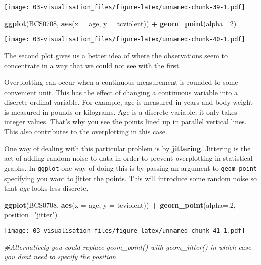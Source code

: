 \documentclass[
]{book}
\newenvironment{Shaded}{\begin{snugshade}}{\end{snugshade}}
\newcommand{\AttributeTok}[1]{\textcolor[rgb]{0.13,0.29,0.53}{#1}}
\newcommand{\CommentTok}[1]{\textcolor[rgb]{0.56,0.35,0.01}{\textit{#1}}}
\newcommand{\DecValTok}[1]{\textcolor[rgb]{0.00,0.00,0.81}{#1}}
\newcommand{\FunctionTok}[1]{\textcolor[rgb]{0.13,0.29,0.53}{\textbf{#1}}}
\newcommand{\NormalTok}[1]{#1}
\newcommand{\SpecialCharTok}[1]{\textcolor[rgb]{0.81,0.36,0.00}{\textbf{#1}}}
\newcommand{\StringTok}[1]{\textcolor[rgb]{0.31,0.60,0.02}{#1}}
\begin{document}
\texttt{[image: 03-visualisation\_files/figure-latex/unnamed-chunk-39-1.pdf]}

\begin{Shaded}
\begin{Highlighting}[]
\FunctionTok{ggplot}\NormalTok{(BCS0708, }\FunctionTok{aes}\NormalTok{(}\AttributeTok{x =}\NormalTok{ age, }\AttributeTok{y =}\NormalTok{ tcviolent)) }\SpecialCharTok{+}
  \FunctionTok{geom\_point}\NormalTok{(}\AttributeTok{alpha=}\NormalTok{.}\DecValTok{2}\NormalTok{)}
\end{Highlighting}
\end{Shaded}

\texttt{[image: 03-visualisation\_files/figure-latex/unnamed-chunk-40-1.pdf]}

The second plot gives us a better idea of where the observations seem to concentrate in a way that we could not see with the first.

Overplotting can occur when a continuous measurement is rounded to some convenient unit. This has the effect of changing a continuous variable into a discrete ordinal variable. For example, age is measured in years and body weight is measured in pounds or kilograms. Age is a discrete variable, it only takes integer values. That's why you see the points lined up in parallel vertical lines. This also contributes to the overplotting in this case.

One way of dealing with this particular problem is by \textbf{jittering}. Jittering is the act of adding random noise to data in order to prevent overplotting in statistical graphs. In \texttt{ggplot} one way of doing this is by passing an argument to \texttt{geom\_point} specifying you want to jitter the points. This will introduce some random noise so that \emph{age} looks less discrete.

\begin{Shaded}
\begin{Highlighting}[]
\FunctionTok{ggplot}\NormalTok{(BCS0708, }\FunctionTok{aes}\NormalTok{(}\AttributeTok{x =}\NormalTok{ age, }\AttributeTok{y =}\NormalTok{ tcviolent)) }\SpecialCharTok{+}
  \FunctionTok{geom\_point}\NormalTok{(}\AttributeTok{alpha=}\NormalTok{.}\DecValTok{2}\NormalTok{, }\AttributeTok{position=}\StringTok{"jitter"}\NormalTok{) }
\end{Highlighting}
\end{Shaded}

\texttt{[image: 03-visualisation\_files/figure-latex/unnamed-chunk-41-1.pdf]}

\begin{Shaded}
\begin{Highlighting}[]
\CommentTok{\#Alternatively you could replace geom\_point() with geom\_jitter() in which case you don\textquotesingle{}t need to specify the position}
\end{Highlighting}
\end{Shaded}
\end{document}
